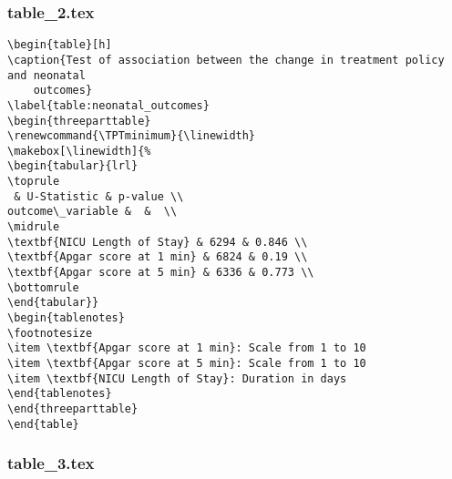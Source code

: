 \documentclass[11pt]{article}
\begin{document}
\subsubsection*{table\_2.tex}

\begin{Verbatim}[tabsize=4]
\begin{table}[h]
\caption{Test of association between the change in treatment policy and neonatal
	outcomes}
\label{table:neonatal_outcomes}
\begin{threeparttable}
\renewcommand{\TPTminimum}{\linewidth}
\makebox[\linewidth]{%
\begin{tabular}{lrl}
\toprule
 & U-Statistic & p-value \\
outcome\_variable &  &  \\
\midrule
\textbf{NICU Length of Stay} & 6294 & 0.846 \\
\textbf{Apgar score at 1 min} & 6824 & 0.19 \\
\textbf{Apgar score at 5 min} & 6336 & 0.773 \\
\bottomrule
\end{tabular}}
\begin{tablenotes}
\footnotesize
\item \textbf{Apgar score at 1 min}: Scale from 1 to 10
\item \textbf{Apgar score at 5 min}: Scale from 1 to 10
\item \textbf{NICU Length of Stay}: Duration in days
\end{tablenotes}
\end{threeparttable}
\end{table}

\end{Verbatim}

\subsubsection*{table\_3.tex}
\end{document}
